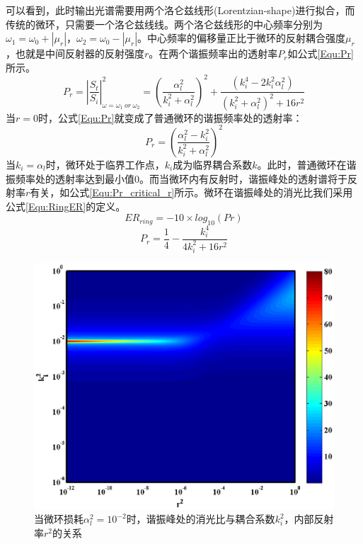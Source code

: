 可以看到，此时输出光谱需要用两个洛仑兹线形(Lorentzian-shape)进行拟合，而传统的微环，只需要一个洛仑兹线线。两个洛仑兹线形的中心频率分别为$\omega_1 = \omega_0+|\mu_r|$，$\omega_2=\omega_0-|\mu_r|$。中心频率的偏移量正比于微环的反射耦合强度$\mu_r$，也就是中间反射器的反射强度$r$。在两个谐振频率出的透射率$P_r$如公式\ref{Equ:Pr}所示。
\begin{equation}
\label{Equ:Pr}
P_r = \left|\frac{S_t}{S_i}\right|^2_{\omega = \omega_1~or~\omega_2}= \left(\frac{\alpha_l^2}{k_i^2+\alpha_l^2}\right)^2+\frac{(k_i^4-2k_i^2\alpha_l^2)}{(k_i^2+\alpha_l^2)^2+16r^2}
\end{equation}
当$r=0$时，公式\ref{Equ:Pr}就变成了普通微环的谐振频率处的透射率：
\begin{equation}
\label{Equ:Pr_no_r}
P_r=\left(\frac{\alpha_l^2-k_i^2}{k_i^2+\alpha_l^2}\right)^2
\end{equation}
当$k_i = \alpha_l$时，微环处于临界工作点，$k_i$成为临界耦合系数$k$。此时，普通微环在谐振频率处的透射率达到最小值0。而当微环内有反射时，谐振峰处的透射谱将于反射率$r$有关，如公式\ref{Equ:Pr_critical_r}所示。微环在谐振峰处的消光比我们采用公式\ref{Equ:RingER}的定义。
\begin{equation}
\label{Equ:RingER}
ER_{ring}=-10 \times log_{10}(Pr)
\end{equation}
\begin{equation}
\label{Equ:Pr_critical_r}
P_r=\frac{1}{4}-\frac{k_i^4}{4k_i^2+16r^2}
\end{equation}
\begin{figure}[htb]
	\centering
	\includegraphics[width=12cm]{./Pictures/chapt5_r_k_Ex_alpha1e-2.eps}
	\caption{当微环损耗$\alpha_l^2= 10^{-2}$时，谐振峰处的消光比与耦合系数$k_i^2$，内部反射率$r^2$的关系}
	\label{chapt5_r_k_Ex_alpha1e-2}
\end{figure}
